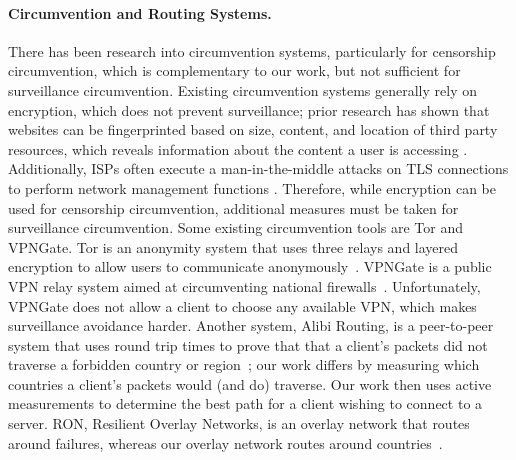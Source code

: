 \paragraph{Circumvention and Routing Systems.}  There has been research into
circumvention systems, particularly for censorship circumvention, which is 
complementary to our work, but not sufficient for surveillance circumvention.  
Existing circumvention systems generally rely on encryption, which does not 
prevent surveillance; prior research has shown that websites can be 
fingerprinted based on size, content, and location of third party resources, which 
reveals information about the content a user is accessing \cite{what_isps_can_see}.  Additionally, 
ISPs often execute a man-in-the-middle attacks on TLS connections to perform 
network management functions \cite{mitm_isp}.  Therefore, while encryption can be 
used for censorship circumvention, additional measures must be taken for 
surveillance circumvention.  Some existing circumvention tools are Tor and VPNGate.
Tor is an anonymity system that uses three relays and layered encryption
to allow users to communicate anonymously~\cite{dingledine2004tor}.
VPNGate is a public VPN relay system aimed at circumventing national
firewalls~\cite{nobori2014vpn}.  Unfortunately, VPNGate does not allow a
client to choose any available VPN, which makes surveillance avoidance
harder.  Another system, Alibi Routing, is a peer-to-peer system that 
uses round trip times to prove that that a client's packets did 
not traverse a forbidden country or region~\cite{levin2015alibi}; our work differs by measuring 
which countries a client's packets would (and do) traverse.  Our work then 
uses active measurements to determine the best path for a client wishing 
to connect to a server.  RON, Resilient Overlay Networks, is an overlay network that 
routes around failures, whereas our overlay network routes around countries~\cite{andersen2001resilient}.

